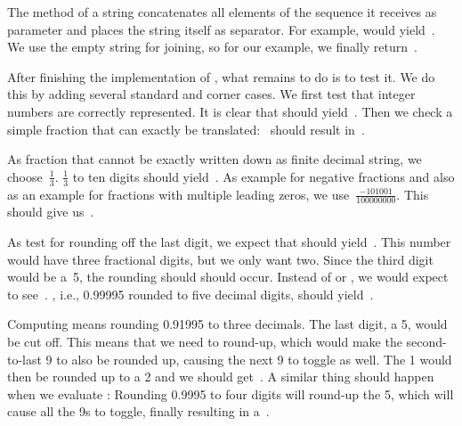 The method  of a string concatenates all elements of the sequence it receives as parameter and places the string itself as separator.
For example,  would yield~.
We use the empty string for joining, so for our example, we finally return~.

After finishing the implementation of , what remains to do is to test it.
We do this by adding several standard and corner cases.
We first test that integer numbers are correctly represented.
It is clear that  should yield~.
Then we check a simple fraction that can exactly be translated:~ should result in~.

%

As fraction that cannot be exactly written down as finite decimal string, we choose~$\frac{1}{3}$.
$\frac{1}{3}$ to ten digits should yield~.
As example for negative fractions and also as an example for fractions with multiple leading zeros, we use~$\frac{-101001}{100000000}$.
This should give us~.

As test for rounding off the last digit, we expect that  should yield~.
This number would have three fractional digits, but we only want two.
Since the third digit would be a~5, the rounding should should occur.
Instead of  or , we would expect to see~.
, i.e., 0.99995 rounded to five decimal digits, should yield~.

Computing  means rounding 0.91995 to three decimals.
The last digit, a 5, would be cut off.
This means that we need to round-up, which would make the second-to-last 9 to also be rounded up, causing the next 9 to toggle as well.
The 1 would then be rounded up to a 2 and we should get~.
A similar thing should happen when we evaluate :
Rounding 0.9995 to four digits will round-up the 5, which will cause all the 9s to toggle, finally resulting in a~.

